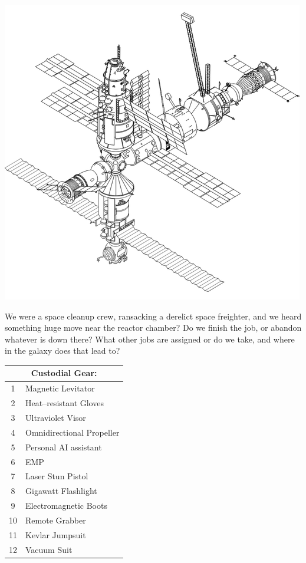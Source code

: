 \documentclass[a4,landscape]{book}
\begin{document}
\begin{multicols*}{4}
\includegraphics[width=\columnwidth]{./station}

We were a space cleanup crew, ransacking a derelict space freighter, and we heard something huge move near the reactor chamber?
Do we finish the job, or abandon whatever is down there?
What other jobs are assigned or do we take, and where in the galaxy does that lead to?
\begin{center}
  \begin{tabular}{|c|l|}
    \hline \multicolumn{2}{|c|}{Custodial Gear:} \\
    \hline 1 & Magnetic Levitator \\
    2 & Heat--resistant Gloves \\
    3 & Ultraviolet Visor \\
    4 & Omnidirectional Propeller \\
    5 & Personal AI assistant \\
    6 & EMP \\
    7 & Laser Stun Pistol \\
    8 & Gigawatt Flashlight \\
    9 & Electromagnetic Boots \\
    10 & Remote Grabber \\
    11 & Kevlar Jumpsuit \\
    12 & Vacuum Suit \\ \hline
  \end{tabular}
\end{center}


\end{multicols*}
\end{document}
